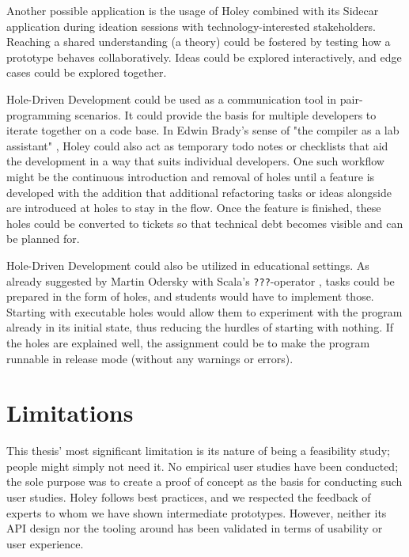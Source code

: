 Another possible application is the usage of Holey combined with its Sidecar application during ideation sessions with technology-interested stakeholders.
Reaching a shared understanding (a theory) could be fostered by testing how a prototype behaves collaboratively.
Ideas could be explored interactively, and edge cases could be explored together.

Hole-Driven Development could be used as a communication tool in pair-programming scenarios.
It could provide the basis for multiple developers to iterate together on a code base.
In Edwin Brady's sense of "the compiler as a lab assistant" \cite{brady_type-driven_2017}, Holey could also act as temporary todo notes or checklists that aid the development in a way that suits individual developers.
One such workflow might be the continuous introduction and removal of holes until a feature is developed with the addition that additional refactoring tasks or ideas alongside are introduced at holes to stay in the flow.
Once the feature is finished, these holes could be converted to tickets so that technical debt becomes visible and can be planned for.

Hole-Driven Development could also be utilized in educational settings.
As already suggested by Martin Odersky with Scala's \verb|???|-operator \cite{odersky_adding_2011}, tasks could be prepared in the form of holes, and students would have to implement those.
Starting with executable holes would allow them to experiment with the program already in its initial state, thus reducing the hurdles of starting with nothing.
If the holes are explained well, the assignment could be to make the program runnable in release mode (without any warnings or errors).



\section{Limitations}
\label{sec:discussion-limitations}
This thesis' most significant limitation is its nature of being a feasibility study; people might simply not need it.
No empirical user studies have been conducted; the sole purpose was to create a proof of concept as the basis for conducting such user studies.
Holey follows best practices, and we respected the feedback of experts to whom we have shown intermediate prototypes.
However, neither its API design nor the tooling around has been validated in terms of usability or user experience.

